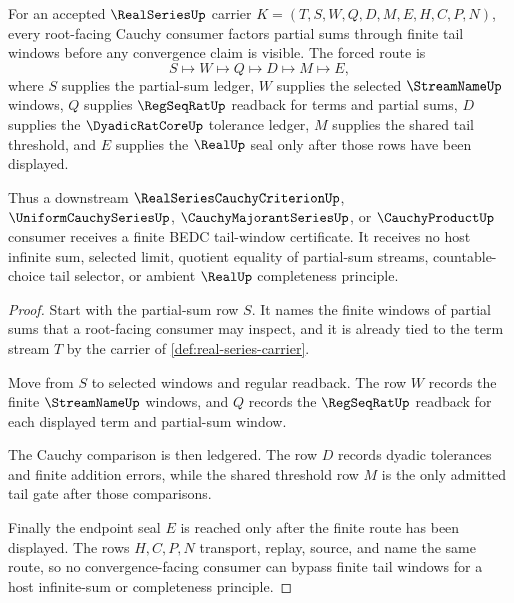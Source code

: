 \begin{theorem}
\label{thm:realseries-root-tail-factorization}
For an accepted $\RealSeriesUp$ carrier $K=(T,S,W,Q,D,M,E,H,C,P,N)$, every root-facing Cauchy consumer factors partial sums through finite tail windows before any convergence claim is visible. The forced route is
$$
S\longmapsto W\longmapsto Q\longmapsto D\longmapsto M\longmapsto E,
$$
where $S$ supplies the partial-sum ledger, $W$ supplies the selected $\StreamNameUp$ windows, $Q$ supplies $\RegSeqRatUp$ readback for terms and partial sums, $D$ supplies the $\DyadicRatCoreUp$ tolerance ledger, $M$ supplies the shared tail threshold, and $E$ supplies the $\RealUp$ seal only after those rows have been displayed.

Thus a downstream $\RealSeriesCauchyCriterionUp$, $\UniformCauchySeriesUp$, $\CauchyMajorantSeriesUp$, or $\CauchyProductUp$ consumer receives a finite BEDC tail-window certificate. It receives no host infinite sum, selected limit, quotient equality of partial-sum streams, countable-choice tail selector, or ambient $\RealUp$ completeness principle.
\end{theorem}
\begin{proof}
Start with the partial-sum row $S$. It names the finite windows of partial sums that a root-facing consumer may inspect, and it is already tied to the term stream $T$ by the carrier of \autoref{def:real-series-carrier}.

Move from $S$ to selected windows and regular readback. The row $W$ records the finite $\StreamNameUp$ windows, and $Q$ records the $\RegSeqRatUp$ readback for each displayed term and partial-sum window.

The Cauchy comparison is then ledgered. The row $D$ records dyadic tolerances and finite addition errors, while the shared threshold row $M$ is the only admitted tail gate after those comparisons.

Finally the endpoint seal $E$ is reached only after the finite route has been displayed. The rows $H,C,P,N$ transport, replay, source, and name the same route, so no convergence-facing consumer can bypass finite tail windows for a host infinite-sum or completeness principle.
\end{proof}

